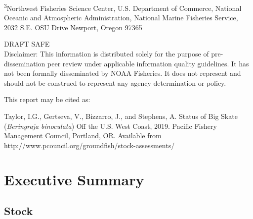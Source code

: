\documentclass[12pt,]{article}
\begin{document}
\begin{center}
\vspace{.3cm}

\textsuperscript{3}Northwest Fisheries Science Center, U.S. Department of Commerce, National Oceanic and Atmospheric Administration, National Marine Fisheries Service, 2032 S.E. OSU Drive Newport, Oregon 97365


\vspace{.5cm}

\vfill
DRAFT SAFE\\
Disclaimer: This information is distributed solely for the purpose of pre-dissemination
peer review under applicable information quality guidelines. It has not been formally
disseminated by NOAA Fisheries. It does not represent and should not be construed to
represent any agency determination or policy. 

\vspace{.3cm}


\newpage{\thispagestyle{empty}}


\begin{flushleft}
This report may be cited as:

Taylor, I.G., Gertseva, V., Bizzarro, J., and Stephens, A. Status of Big Skate (\emph{Beringraja binoculata}) Off the U.S. West Coast, 2019. Pacific Fishery Management Council, Portland, OR. Available from http://www.pcouncil.org/groundfish/stock-assessments/
\end{flushleft}

\maketitle

\setcounter{page}{1}
\end{center}

{
\setcounter{tocdepth}{4}
\tableofcontents
}
\setlength{\parskip}{5mm plus1mm minus1mm}
\pagebreak


\renewcommand{\thefigure}{\alph{figure}}
\renewcommand{\thetable}{\alph{table}}

\hypertarget{executive-summary}{%
\section*{Executive Summary}\label{executive-summary}}

\hypertarget{stock}{%
\subsection*{Stock}\label{stock}}
\end{document}
